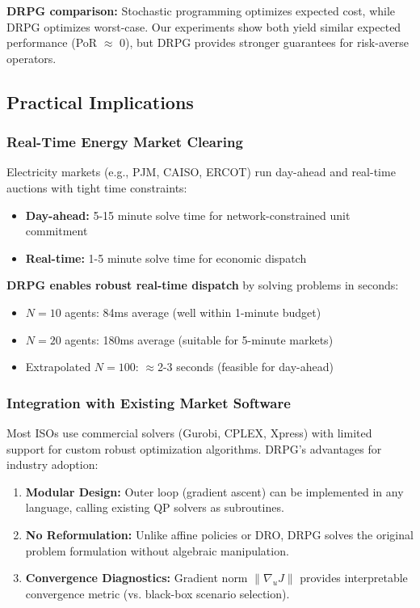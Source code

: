 \textbf{DRPG comparison:} Stochastic programming optimizes expected cost, while DRPG optimizes worst-case. Our experiments show both yield similar expected performance (PoR $\approx$ 0), but DRPG provides stronger guarantees for risk-averse operators.

\subsection{Practical Implications}
\label{sec:practical_implications}

\subsubsection{Real-Time Energy Market Clearing}

Electricity markets (e.g., PJM, CAISO, ERCOT) run day-ahead and real-time auctions with tight time constraints:
\begin{itemize}
    \item \textbf{Day-ahead:} 5-15 minute solve time for network-constrained unit commitment
    \item \textbf{Real-time:} 1-5 minute solve time for economic dispatch
\end{itemize}

\textbf{DRPG enables robust real-time dispatch} by solving problems in seconds:
\begin{itemize}
    \item $N=10$ agents: 84ms average (well within 1-minute budget)
    \item $N=20$ agents: 180ms average (suitable for 5-minute markets)
    \item Extrapolated $N=100$: $\approx$2-3 seconds (feasible for day-ahead)
\end{itemize}

\subsubsection{Integration with Existing Market Software}

Most ISOs use commercial solvers (Gurobi, CPLEX, Xpress) with limited support for custom robust optimization algorithms. DRPG's advantages for industry adoption:

\begin{enumerate}
    \item \textbf{Modular Design:} Outer loop (gradient ascent) can be implemented in any language, calling existing QP solvers as subroutines.

    \item \textbf{No Reformulation:} Unlike affine policies or DRO, DRPG solves the original problem formulation without algebraic manipulation.

    \item \textbf{Convergence Diagnostics:} Gradient norm $\|\nabla_u J\|$ provides interpretable convergence metric (vs. black-box scenario selection).
\end{enumerate}

